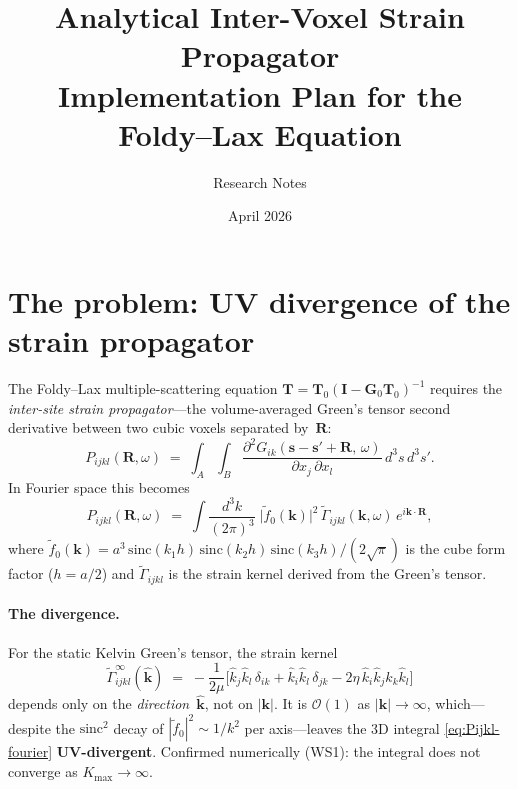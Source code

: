 \documentclass[11pt,a4paper]{article}
\title{Analytical Inter-Voxel Strain Propagator\\
\large Implementation Plan for the Foldy--Lax Equation}
\author{Research Notes}
\date{April 2026}
\newcommand{\bR}{\bm{R}}
\newcommand{\bk}{\bm{k}}
\newcommand{\bs}{\bm{s}}
\newcommand{\kh}{\hat{\bm{k}}}
\newcommand{\order}{\mathcal{O}}
\theoremstyle{plain}
\theoremstyle{remark}
\begin{document}
\maketitle
\tableofcontents
\vspace{1em}

\section{The problem: UV divergence of the strain propagator}
\label{sec:problem}

The Foldy--Lax multiple-scattering equation
$\mathbf{T} = \mathbf{T}_0(\mathbf{I} - \mathbf{G}_0\mathbf{T}_0)^{-1}$
requires the \emph{inter-site strain propagator}---the volume-averaged
Green's tensor second derivative between two cubic voxels separated by~$\bR$:
\begin{equation}
  P_{ijkl}(\bR,\omega) \;=\;
  \int_A\!\int_B
  \frac{\partial^2 G_{ik}(\bs-\bs'+\bR,\,\omega)}%
       {\partial x_j\,\partial x_l}\,d^3s\,d^3s'.
  \label{eq:Pijkl-def}
\end{equation}
In Fourier space this becomes
\begin{equation}
  P_{ijkl}(\bR,\omega) \;=\;
  \int\!\frac{d^3k}{(2\pi)^3}\;
  \bigl|\tilde{f}_0(\bk)\bigr|^2\,
  \tilde{\Gamma}_{ijkl}(\bk,\omega)\,
  e^{i\bk\cdot\bR},
  \label{eq:Pijkl-fourier}
\end{equation}
where $\tilde{f}_0(\bk) = a^3\,\mathrm{sinc}(k_1 h)\,
\mathrm{sinc}(k_2 h)\,\mathrm{sinc}(k_3 h)/(2\sqrt{\pi})$
is the cube form factor ($h=a/2$) and
$\tilde{\Gamma}_{ijkl}$ is the strain kernel derived from the
Green's tensor.

\paragraph{The divergence.}
For the static Kelvin Green's tensor, the strain kernel
\begin{equation}
  \tilde{\Gamma}^\infty_{ijkl}(\kh) \;=\;
  -\frac{1}{2\mu}\bigl[
    \hat{k}_j\hat{k}_l\,\delta_{ik}
  + \hat{k}_i\hat{k}_l\,\delta_{jk}
  - 2\eta\,\hat{k}_i\hat{k}_j\hat{k}_k\hat{k}_l
  \bigr]
  \label{eq:Gamma-inf}
\end{equation}
depends only on the \emph{direction}~$\kh$, not on $|\bk|$.
It is $\order(1)$ as $|\bk|\to\infty$, which---despite the
$\mathrm{sinc}^2$ decay of $|\tilde{f}_0|^2 \sim 1/k^2$ per
axis---leaves the 3D integral \eqref{eq:Pijkl-fourier}
\textbf{UV-divergent}.  Confirmed numerically (WS1): the integral
does not converge as $K_{\max}\to\infty$.
\end{document}
